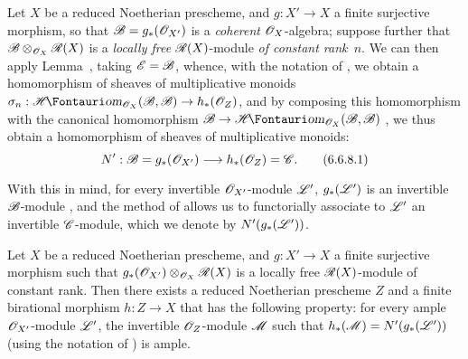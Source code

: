 \begin{env}[6.6.8]
\label{II.6.6.8}
Let $X$ be a reduced Noetherian prescheme, and $g:X'\to X$ a finite surjective morphism, so that $\mathscr{B}=g_*(\mathscr{O}_{X'})$ is a \emph{coherent} $\mathscr{O}_X$-algebra;
suppose further that $\mathscr{B}\otimes_{\mathscr{O}_X}\mathscr{R}(X)$ is a \emph{locally free} $\mathscr{R}(X)$-module \emph{of constant rank~$n$}.
We can then apply Lemma~, taking $\mathscr{E}=\mathscr{B}$, whence, with the notation of , we obtain a homomorphism of sheaves of multiplicative monoids $\sigma_n:\shHom_{\sh{O}_X}(\sh{B},\sh{B})\to h_*(\sh{O}_Z)$, and by composing this homomorphism with the canonical homomorphism $\sh{B}\to\shHom_{\sh{O}_X}(\sh{B},\sh{B})$ , we thus obtain a homomorphism of sheaves of multiplicative monoids:
\[
\label{II.6.6.8.1}
  N' : \sh{B} = g_*(\sh{O}_{X'}) \to h_*(\sh{O}_Z) = \sh{C}.
\tag{6.6.8.1}
\]

With this in mind, for every invertible $\mathscr{O}_{X'}$-module $\mathscr{L}'$, $g_*(\mathscr{L}')$ is an invertible $\mathscr{B}$-module , and the method of  allows us to functorially associate to $\mathscr{L}'$ an invertible $\mathscr{C}$-module, which we denote by $N'(g_*(\mathscr{L}'))$.
\end{env}

\begin{lemma}[6.6.9]
\label{II.6.6.9}
Let $X$ be a reduced Noetherian prescheme, and $g:X'\to X$ a finite surjective morphism such that $g_*(\mathscr{O}_{X'})\otimes_{\mathscr{O}_X}\mathscr{R}(X)$ is a locally free $\mathscr{R}(X)$-module of constant rank.
Then there exists a reduced Noetherian prescheme $Z$ and a finite birational morphism $h:Z\to X$ that has the following property: for every ample $\mathscr{O}_{X'}$-module $\mathscr{L}'$, the invertible $\mathscr{O}_Z$-module $\mathscr{M}$ such that $h_*(\mathscr{M})=N'(g_*(\mathscr{L}'))$ (using the notation of ) is ample.
\end{lemma}

